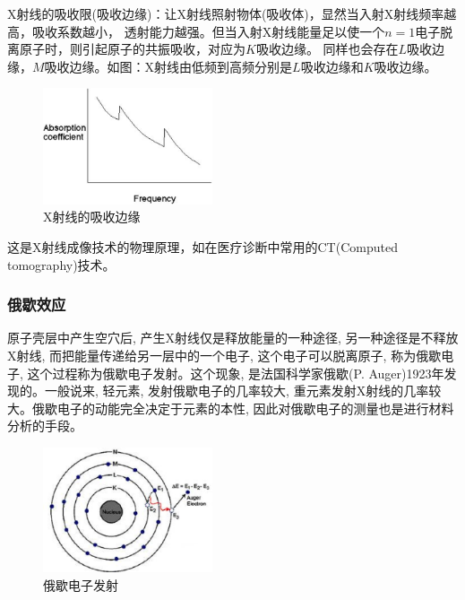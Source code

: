 X射线的吸收限(吸收边缘)：让X射线照射物体(吸收体)，显然当入射X射线频率越高，吸收系数越小，
透射能力越强。但当入射X射线能量足以使一个$n=1$电子脱离原子时，则引起原子的共振吸收，对应为$K$吸收边缘。
同样也会存在$L$吸收边缘，$M$吸收边缘。如图：X射线由低频到高频分别是$L$吸收边缘和$K$吸收边缘。

\begin{figure}[h]
\begin{center}
\includegraphics[clip,width=5cm]{BohrModel/4-8.ps}
\caption{X射线的吸收边缘}
\end{center}
\end{figure}

这是X射线成像技术的物理原理，如在医疗诊断中常用的CT(Computed
tomography)技术。


\subsubsection{俄歇效应}



原子壳层中产生空穴后, 产生X射线仅是释放能量的一种途径,
另一种途径是不释放X射线, 而把能量传递给另一层中的一个电子,
这个电子可以脱离原子, 称为俄歇电子,
这个过程称为俄歇电子发射。这个现象, 是法国科学家俄歇(P.
Auger)1923年发现的。一般说来, 轻元素, 发射俄歇电子的几率较大,
重元素发射X射线的几率较大。俄歇电子的动能完全决定于元素的本性,
因此对俄歇电子的测量也是进行材料分析的手段。


\begin{figure}[h]
\begin{center}
\includegraphics[clip,width=5cm]{BohrModel/auger-effect.ps}
\caption{俄歇电子发射}\label{auger electron}
\end{center}
\end{figure}


